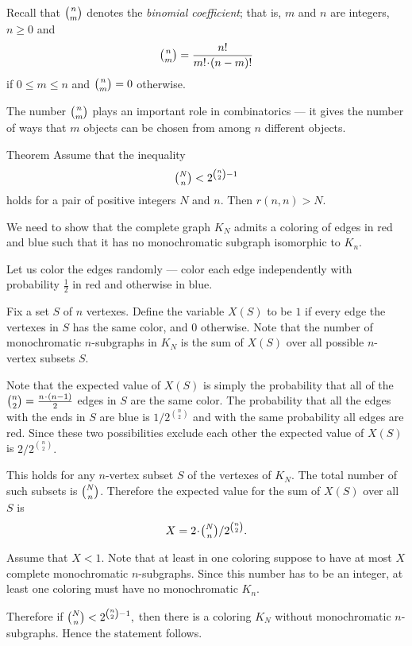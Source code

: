 \medskip

Recall that $\tbinom{n}{m}$ denotes the \emph{binomial coefficient};
that is, $m$ and $n$ are integers, $n\ge 0$ and 
\[\tbinom nm=\frac{n!}{m!\cdot (n-m)!}\]
if $0\le m\le n$ and $\tbinom{n}{m}=0$ otherwise.

The number $\tbinom{n}{m}$ plays an important role in combinatorics ---
it gives the number of ways that $m$ objects can be chosen from among $n$ different objects.

\begin{thm}{Theorem}\label{thm:ramsey-lower}
Assume that the inequality 
\[\tbinom N n < 2^{{\binom n 2} - 1}\]
holds for a pair of positive integers $N$ and $n$.
Then $r(n,n)>N$.
\end{thm}

We need to show that the complete graph $K_N$
admits a coloring of edges in red and blue such that it has no monochromatic subgraph isomorphic to $K_n$.

Let us color the edges randomly ---
color each edge independently with probability $\tfrac12$ in red and otherwise in blue.

Fix a set $S$ of $n$ vertexes. 
Define the variable $X(S)$ to be $1$ if every edge the vertexes in $S$ has the same color, and $0$ otherwise.
Note that the number of monochromatic $n$-subgraphs in $K_N$ is the sum of $X(S)$ over all possible $n$-vertex subsets $S$. 

Note that the expected value of $X(S)$ is simply the probability that all of the $\tbinom n 2=\tfrac{n\cdot(n-1)}{2}$
edges in $S$ are the same color. 
The probability that all the edges with the ends in $S$ are blue is ${1}/{2^{\binom n 2}}$ and with the same probability all edges are red.
Since these two possibilities exclude each other the expected value of $X(S)$ is 
${2}/{2^{\binom n 2}}.$

This holds for any $n$-vertex subset $S$ of the vertexes of $K_N$.
The total number of such subsets is $\tbinom N n$.
Therefore the expected value for the sum of $X(S)$ over all $S$ is
\[X=2\cdot \tbinom N n/2^{\binom n 2}.\]

Assume that $X<1$.
Note that at least in one coloring suppose to have at most $X$ complete monochromatic $n$-subgraphs.
Since this number has to be an integer, at least one coloring must have no monochromatic $K_n$. 

Therefore if
$\tbinom N n < 2^{\binom n 2 - 1},$
then there is a coloring $K_N$ without monochromatic $n$-subgraphs.
Hence the statement follows.
\qeds

